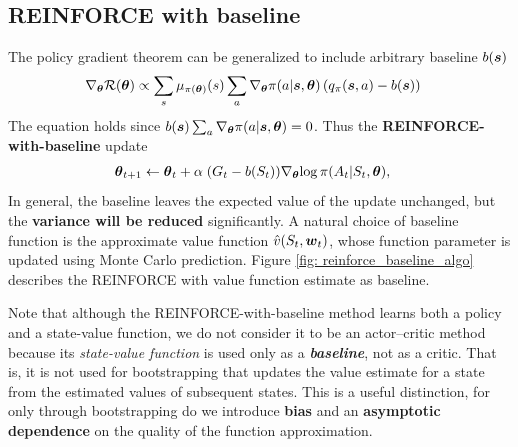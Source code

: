 \documentclass[11pt]{article}
\begin{document}
\subsection{REINFORCE with baseline}
The policy gradient theorem can be generalized to include arbitrary baseline $b(\boldsymbol{s})$
\begin{align*}
\nabla_{\boldsymbol{\theta}}{{\mathcal R}(\boldsymbol{\theta})} &\propto \sum_{s}\mu_{\pi(\boldsymbol{\theta})}(s)\sum_{a}\nabla_{\boldsymbol{\theta}}{\pi(a |\boldsymbol{s}, \boldsymbol{\theta})}\left(q_{\pi}(\boldsymbol{s}, a) - b(\boldsymbol{s})\right)
\end{align*} The equation holds since $b(\boldsymbol{s})\sum_{a}\nabla_{\boldsymbol{\theta}}{\pi(a |\boldsymbol{s}, \boldsymbol{\theta})} = 0$. Thus the \textbf{REINFORCE-with-baseline} update
\begin{align}
\boldsymbol{\theta}_{t+1} &\leftarrow \boldsymbol{\theta}_{t} + \alpha \;(G_{t}-b(S_t))\nabla_{\boldsymbol{\theta}}{\log\pi(A_{t}|S_{t}, \boldsymbol{\theta})}, \label{eqn: reinforce_update_w_baseline}
\end{align} In general, the baseline leaves the expected value of the update unchanged, but the \textbf{variance will be reduced} significantly. A natural choice of baseline function is the approximate value function $\hat{v}(S_t, \boldsymbol{w}_t)$, whose function parameter is updated using Monte Carlo prediction.  Figure \ref{fig: reinforce_baseline_algo} describes the REINFORCE with value function estimate as baseline. 

Note that although the REINFORCE-with-baseline method learns both a policy and a state-value function, we do not consider it to be an actor–critic method because its \emph{state-value function} is used only as a \emph{\textbf{baseline}}, not as a critic. That is, it is not used for bootstrapping that updates the value estimate for a state from the estimated values of subsequent states. This is a useful distinction, for only through bootstrapping do we introduce \textbf{bias} and an \textbf{asymptotic dependence}
on the quality of the function approximation. 
\end{document}
